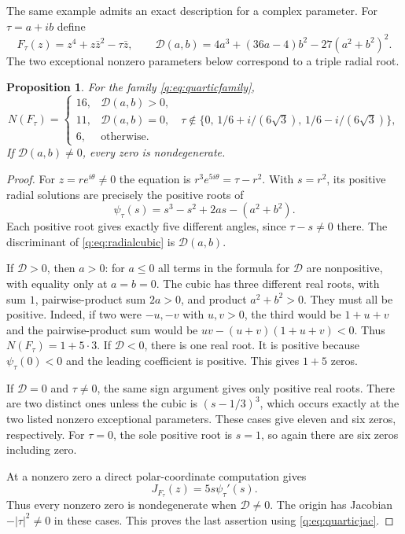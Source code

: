 \documentclass[UTF8,11pt]{ctexart}
\newtheorem{prop}[thm]{Proposition}
\theoremstyle{definition}
\numberwithin{equation}{section}
\begin{document}
The same example admits an exact description for a complex parameter.
For $\tau=a+ib$ define
\begin{equation}\label{q:eq:quarticfamily}
 F_\tau(z)=z^4+z\bar z^2-\tau\bar z,
 \qquad
 \mathcal D(a,b)=4a^3+(36a-4)b^2-27(a^2+b^2)^2.
\end{equation}
The two exceptional nonzero parameters below correspond to a triple
radial root.
\begin{prop}\label{q:prop:region}
For the family \eqref{q:eq:quarticfamily},
\[
 N(F_\tau)=
 \begin{cases}
 16,&\mathcal D(a,b)>0,\\
 11,&\mathcal D(a,b)=0,\quad
       \tau\notin\{0,\,1/6+i/(6\sqrt3),\,1/6-i/(6\sqrt3)\},\\
 6,&\text{otherwise}.
 \end{cases}
\]
If $\mathcal D(a,b)\ne0$, every zero is nondegenerate.
\end{prop}
\begin{proof}
For $z=re^{i\theta}\ne0$ the equation is
$r^3e^{5i\theta}=\tau-r^2$. With $s=r^2$, its positive radial solutions
are precisely the positive roots of
\begin{equation}\label{q:eq:radialcubic}
 \psi_\tau(s)=s^3-s^2+2as-(a^2+b^2).
\end{equation}
Each positive root gives exactly five different angles, since
$\tau-s\ne0$ there. The discriminant of \eqref{q:eq:radialcubic} is
$\mathcal D(a,b)$.

If $\mathcal D>0$, then $a>0$: for $a\le0$ all terms in the formula for
$\mathcal D$ are nonpositive, with equality only at $a=b=0$.
The cubic has three different real roots, with sum $1$, pairwise-product
sum $2a>0$, and product $a^2+b^2>0$. They must all be positive. Indeed,
if two were $-u,-v$ with $u,v>0$, the third would be $1+u+v$ and the
pairwise-product sum would be
$uv-(u+v)(1+u+v)<0$. Thus $N(F_\tau)=1+5\cdot3$.
If $\mathcal D<0$, there is one real root. It is positive because
$\psi_\tau(0)<0$ and the leading coefficient is positive. This gives
$1+5$ zeros.

If $\mathcal D=0$ and $\tau\ne0$, the same sign argument gives only
positive real roots. There are two distinct ones unless the cubic is
$(s-1/3)^3$, which occurs exactly at the two listed nonzero exceptional
parameters. These cases give eleven and six zeros, respectively.
For $\tau=0$, the sole positive root is $s=1$, so again there are six
zeros including zero.

At a nonzero zero a direct polar-coordinate computation gives
\begin{equation}\label{q:eq:quarticjac}
 J_{F_\tau}(z)=5s\psi_\tau'(s).
\end{equation}
Thus every nonzero zero is nondegenerate when $\mathcal D\ne0$.
The origin has Jacobian $-|\tau|^2\ne0$ in these cases. This proves
the last assertion using \eqref{q:eq:quarticjac}.
\end{proof}
\end{document}
